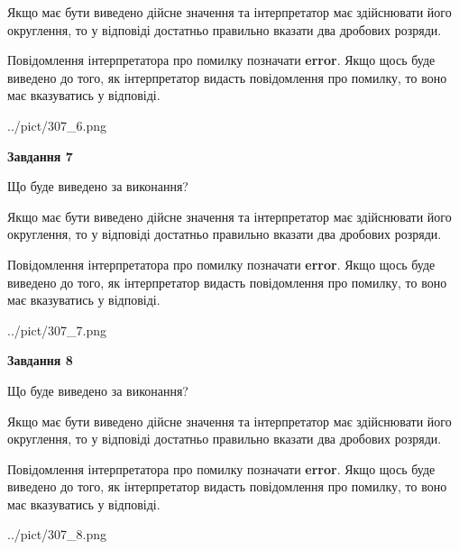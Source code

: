 \documentclass[12pt, ukrainian]{article}
\begin{document}
{\begin {Large}
Якщо має бути виведено дійсне значення та інтерпретатор має здійснювати його округлення, 
то у відповіді достатньо правильно вказати два дробових розряди.

Повідомлення інтерпретатора про помилку позначати \textbf{error}.
Якщо щось буде виведено до того, як інтерпретатор видасть повідомлення про помилку, 
то воно має вказуватись у відповіді. \par

\begin{center}
	{../pict/307_6.png}
\end{center}
\newpage

{\begin {center}\textbf{Завдання 7}\end {center}}\par
Що буде виведено за виконання? \par

Якщо має бути виведено дійсне значення та інтерпретатор має здійснювати його округлення, 
то у відповіді достатньо правильно вказати два дробових розряди.

Повідомлення інтерпретатора про помилку позначати \textbf{error}.
Якщо щось буде виведено до того, як інтерпретатор видасть повідомлення про помилку, 
то воно має вказуватись у відповіді. \par

\begin{center}
	{../pict/307_7.png}
\end{center}
\newpage

{\begin {center}\textbf{Завдання 8}\end {center}}\par
Що буде виведено за виконання? \par

Якщо має бути виведено дійсне значення та інтерпретатор має здійснювати його округлення, 
то у відповіді достатньо правильно вказати два дробових розряди.

Повідомлення інтерпретатора про помилку позначати \textbf{error}.
Якщо щось буде виведено до того, як інтерпретатор видасть повідомлення про помилку, 
то воно має вказуватись у відповіді. \par

\begin{center}
	{../pict/307_8.png}
\end{center}
\newpage


\end{Large}}
\end{document}
